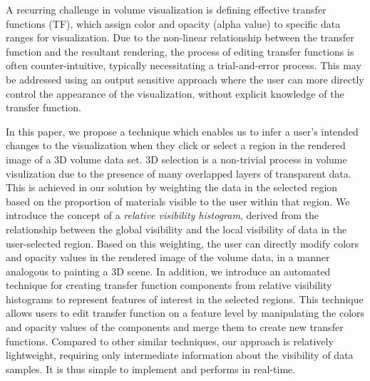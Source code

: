\documentclass[twoside,twocolumn,10pt]{article}
\begin{document}
A recurring challenge in volume visualization is defining effective transfer functions (TF), which assign color and opacity (alpha value) to specific data ranges for visualization. Due to the non-linear relationship between the transfer function and the resultant rendering, the process of editing transfer functions is often counter-intuitive, typically necessitating a trial-and-error process. This may be addressed using an output sensitive approach where the user can more directly control the appearance of the visualization, without explicit knowledge of the transfer function. 

In this paper, we propose a technique which enables us to infer a user's intended changes to the visualization when they click or select a region in the rendered image of a 3D volume data set. 3D selection is a non-trivial process in volume visulization due to the presence of many overlapped layers of transparent data. This is achieved in our solution by weighting the data in the selected region based on the proportion of materials visible to the user within that region. We introduce the concept of a \emph{relative visibility histogram}, derived from the relationship between the global visibility and the local visibility of data in the user-selected region.
Based on this weighting, the user can directly modify colors and opacity values in the rendered image of the volume data, in a manner analogous to painting a 3D scene.
In addition, we introduce an automated technique for creating transfer function components from relative visibility histograms to represent features of interest in the selected regions.
This technique allows users to edit transfer function on a feature level by manipulating the colors and opacity values of the components and merge them to create new transfer functions.
Compared to other similar techniques, our approach is relatively lightweight, requiring only intermediate information about the visibility of data samples. It is thus simple to implement and performs in real-time.


\end{document}
